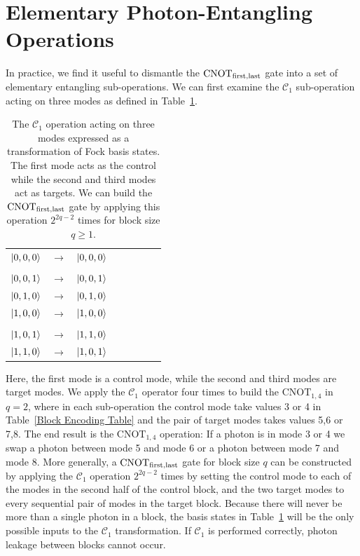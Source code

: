 \documentclass[aps,pra,twocolumn,superscriptaddress,floatfix,10pt]{revtex4}
\begin{document}
\section{Elementary Photon-Entangling Operations}
\label{Section Elementary Photon Entangling Operations}

 In practice, we find it useful to dismantle the $\mbox{CNOT}_{\rm first,last}$ gate into a set of elementary entangling sub-operations. We can first examine the $\mathcal{C}_1$ sub-operation acting on three modes as defined in Table~\ref{One Control Two Targets}. 
\begin {table}[h]
\begin{center}
	\begin{tabular}{l*{6}{c}r} 
		$\ket{0,0,0}$  &  $\rightarrow$ & $\ket{0,0,0}$ \\ \\
		$\ket{0,0,1}$  & $\rightarrow$ & $\ket{0,0,1}$ \\
		$\ket{0,1,0}$ & $\rightarrow$ & $\ket{0,1,0}$ \\
		$\ket{1,0,0}$ & $\rightarrow$ & $\ket{1,0,0} $ \\ \\
		$\ket{1,0,1}$ & $\rightarrow$ & $\ket{1,1,0}$ \\
		$\ket{1,1,0}$ & $\rightarrow$ & $\ket{1,0,1}$ \\
	\end{tabular}
	\caption{ \label{One Control Two Targets} The $\mathcal{C}_1$  operation acting on three modes expressed as a transformation of Fock basis states. The first mode acts as the control while the second and third modes act as targets. We can build the $\mbox{CNOT}_{\rm first,last}$ gate by applying this operation $2^{2 q -2}$ times for block size $q \ge 1 $.}
\end{center}
\end{table}
Here, the first mode is a control mode, while the second and third modes are target modes. We apply the $\mathcal{C}_1$  operator four times to build the $\mbox{CNOT}_{1,4}$ in $q=2$, where in each sub-operation the control mode take values 3 or 4 in Table~\ref{Block Encoding Table} and the pair of target modes takes values 5,6 or 7,8. The end result is the $\mbox{CNOT}_{1,4}$ operation: If a photon is in mode 3 or 4 we swap a photon between mode 5 and mode 6 or a photon between mode 7 and mode 8. More generally, a $\mbox{CNOT}_{\rm first,last}$ gate for block size $q$ can be constructed by applying the $\mathcal{C}_1$  operation $2^{2q-2}$ times by setting the control mode to each of the modes in the second half of the control block, and the two target modes to every sequential pair of modes in the target block. Because there will never be more than a single photon in a block, the basis states in Table~\ref{One Control Two Targets} will be the only possible inputs to the $\mathcal{C}_1$  transformation. If $\mathcal{C}_1$ is performed correctly, photon leakage between blocks cannot occur.
\end{document}
